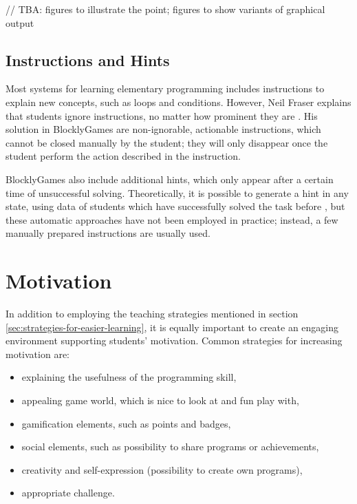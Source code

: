 // TBA: figures to illustrate the point; figures to show variants of graphical output


\subsection{Instructions and Hints}
\label{sec:instructions-and-hints}

Most systems for learning elementary programming includes instructions
  to explain new concepts, such as loops and conditions.
However, Neil Fraser explains that students ignore instructions,
  no matter how prominent they are \cite{blockly-10-things}.
His solution in BlocklyGames are non-ignorable, actionable instructions,
  which cannot be closed manually by the student;
  they will only disappear once the student perform the action described in the instruction.

BlocklyGames also include additional hints,
  which only appear after a certain time of unsuccessful solving.
Theoretically, it is possible to generate a hint in any state,
  using data of students which have successfully solved the task before
  \cite{generating-hints},
  but these automatic approaches have not been employed in practice;
  instead, a few manually prepared instructions are usually used.



\section{Motivation}
\label{sec:motivation}

In addition to employing the teaching strategies mentioned in section \ref{sec:strategies-for-easier-learning},
  it is equally important to create an engaging environment supporting students’ motivation. Common strategies for increasing motivation are:

\begin{itemize}
\item explaining the usefulness of the programming skill,
\item appealing game world, which is nice to look at and fun play with,
\item gamification elements, such as points and badges,
\item social elements, such as possibility to share programs or achievements,
\item creativity and self-expression (possibility to create own programs),
\item appropriate challenge.
\end{itemize}


